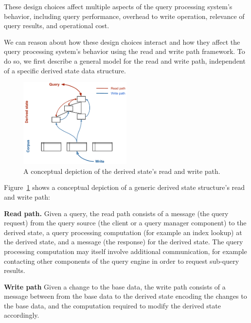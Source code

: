 These design choices affect multiple aspects of the query processing system's behavior,
including query performance, overhead to write operation, relevance of query results, and operational cost.

We can reason about how these design choices interact and how they affect the query processing system's behavior
using the read and write path framework.
To do so, we first describe a general model for the read and write path,
independent of a specific derived state data structure.

\begin{figure}[H]
  \centering
    \includegraphics[width=0.5\textwidth]{./figures/design_space/read_write_path.pdf}
  \caption{A conceptual depiction of the derived state's read and write path.}
  \label{fig:design_space_read_write_path}
\end{figure}

\noindent
Figure~\ref{fig:design_space_read_write_path} shows a conceptual depiction of a generic derived state structure's read
and write path:

\textbf{Read path.}
Given a query, the read path consists of a message (the query request) from the query source (the client or a query manager component)
to the derived state, a query processing computation (for example an index lookup) at the derived state,
and a message (the response) for the derived state.
The query processing computation may itself involve additional communication, for example contacting other components of
the query engine in order to request sub-query results.

\textbf{Write path}
Given a change to the base data,
the write path consists of a message between from the base data to the derived state encoding the changes to the base data,
and the computation required to modify the derived state accordingly.


